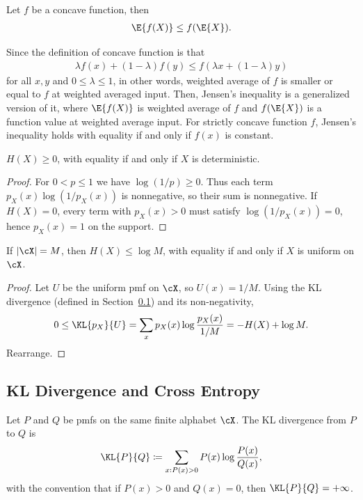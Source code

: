 \begin{theorem}
Let $f$ be a concave function, then
\begin{align}
    \E{f(X)} \leq f(\E{X}).
\end{align}
\end{theorem}
Since the definition of concave function is that
\begin{align}
    \lambda f(x) + (1-\lambda) f(y) \leq f(\lambda x + (1-\lambda) y)
\end{align}
for all $x, y$ and $0\leq \lambda \leq 1$,
in other words, weighted average of $f$ is smaller or equal to $f$ at weighted averaged input.
Then, Jensen's inequality is a generalized version of it,
where $\E{f(X)}$ is weighted average of $f$ and $f(\E{X})$ is a function value at weighted average input.
For strictly concave function $f$, Jensen's inequality holds with equality if and only if $f(x)$ is constant.


\begin{theorem}
$H(X)\ge 0$, with equality if and only if $X$ is deterministic.
\end{theorem}
\begin{proof}
For $0<p\le 1$ we have $\log(1/p)\ge 0$.
Thus each term $p_X(x)\log(1/p_X(x))$ is nonnegative, so their sum is nonnegative.
If $H(X)=0$, every term with $p_X(x)>0$ must satisfy $\log(1/p_X(x))=0$, hence $p_X(x)=1$ on the support.
\end{proof}

\begin{theorem}
If $|\cX|=M$, then $H(X)\le \log M$, with equality if and only if $X$ is uniform on $\cX$.
\end{theorem}
\begin{proof}
Let $U$ be the uniform pmf on $\cX$, so $U(x)=1/M$.
Using the KL divergence (defined in Section~\ref{sec:entropy-kl}) and its non-negativity,
\[
0\le \KL{p_X}{U}=\sum_x p_X(x)\log\frac{p_X(x)}{1/M} = -H(X)+\log M.
\]
Rearrange.
\end{proof}

\subsection{KL Divergence and Cross Entropy}
\label{sec:entropy-kl}

\begin{definition}
Let $P$ and $Q$ be pmfs on the same finite alphabet $\cX$.
The KL divergence from $P$ to $Q$ is
\begin{equation}
    \KL{P}{Q}
    \coloneqq \sum_{x:P(x)>0} P(x)\log\frac{P(x)}{Q(x)},
\end{equation}
with the convention that if $P(x)>0$ and $Q(x)=0$, then $\KL{P}{Q}=+\infty$.
\end{definition}

